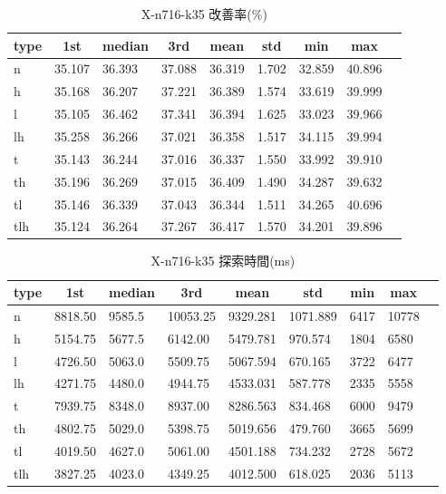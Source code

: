 \begin{table}[htbp]
    \centering
    \caption{X-n716-k35 改善率(\%)}
    \begin{tabular}{|l|l|l|l|l|l|l|l|l|}\hline
    \multicolumn{1}{|c|}{\textbf{type}}
    &\multicolumn{1}{|c|}{\textbf{1st}}
    &\multicolumn{1}{c|}{\textbf{median}}
    &\multicolumn{1}{c|}{\textbf{3rd}}
    &\multicolumn{1}{c|}{\textbf{mean}}
    &\multicolumn{1}{c|}{\textbf{std}}
    &\multicolumn{1}{c|}{\textbf{min}}
    &\multicolumn{1}{c|}{\textbf{max}}\\\hline
	n & 35.107 & 36.393 & 37.088 & 36.319 & 1.702 & 32.859 & 40.896\\\hline
	h & 35.168 & 36.207 & 37.221 & 36.389 & 1.574 & 33.619 & 39.999\\\hline
	l & 35.105 & 36.462 & 37.341 & 36.394 & 1.625 & 33.023 & 39.966\\\hline
	lh & 35.258 & 36.266 & 37.021 & 36.358 & 1.517 & 34.115 & 39.994\\\hline
	t & 35.143 & 36.244 & 37.016 & 36.337 & 1.550 & 33.992 & 39.910\\\hline
	th & 35.196 & 36.269 & 37.015 & 36.409 & 1.490 & 34.287 & 39.632\\\hline
	tl & 35.146 & 36.339 & 37.043 & 36.344 & 1.511 & 34.265 & 40.696\\\hline
	tlh & 35.124 & 36.264 & 37.267 & 36.417 & 1.570 & 34.201 & 39.896\\\hline
	\end{tabular}
\end{table}
\begin{table}[htbp]
    \centering
    \caption{X-n716-k35 探索時間(ms)}
    \begin{tabular}{|l|l|l|l|l|l|l|l|l|}\hline
    \multicolumn{1}{|c|}{\textbf{type}}
    &\multicolumn{1}{|c|}{\textbf{1st}}
    &\multicolumn{1}{c|}{\textbf{median}}
    &\multicolumn{1}{c|}{\textbf{3rd}}
    &\multicolumn{1}{c|}{\textbf{mean}}
    &\multicolumn{1}{c|}{\textbf{std}}
    &\multicolumn{1}{c|}{\textbf{min}}
    &\multicolumn{1}{c|}{\textbf{max}}\\\hline
	n & 8818.50 & 9585.5 & 10053.25 & 9329.281 & 1071.889 & 6417 & 10778\\\hline
	h & 5154.75 & 5677.5 & 6142.00 & 5479.781 & 970.574 & 1804 & 6580\\\hline
	l & 4726.50 & 5063.0 & 5509.75 & 5067.594 & 670.165 & 3722 & 6477\\\hline
	lh & 4271.75 & 4480.0 & 4944.75 & 4533.031 & 587.778 & 2335 & 5558\\\hline
	t & 7939.75 & 8348.0 & 8937.00 & 8286.563 & 834.468 & 6000 & 9479\\\hline
	th & 4802.75 & 5029.0 & 5398.75 & 5019.656 & 479.760 & 3665 & 5699\\\hline
	tl & 4019.50 & 4627.0 & 5061.00 & 4501.188 & 734.232 & 2728 & 5672\\\hline
	tlh & 3827.25 & 4023.0 & 4349.25 & 4012.500 & 618.025 & 2036 & 5113\\\hline
	\end{tabular}
\end{table}

